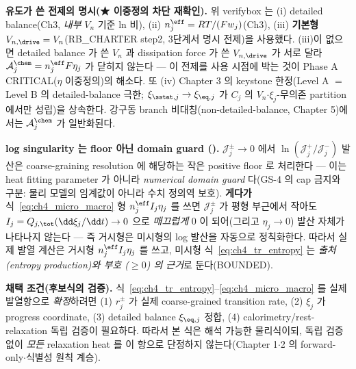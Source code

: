 \textbf{유도가 쓴 전제의 명시(★ 이중정의 차단 재확인).} 위 verifybox 는 (i) detailed balance(Ch3, \emph{내부}
$V_n$ 기준 ln 비), (ii) $n_j^{\eff}=RT/(Fw_j)$(Ch3), (iii) \textbf{기본형 $V_{n,\drive}=V_n$}(RB\_CHARTER
step2, 3단계서 명시 전제)을 사용했다. (iii)이 없으면 detailed balance 가 쓴 $V_n$ 과 dissipation force 가 쓴
$V_{n,\drive}$ 가 서로 달라 $\mathcal A_j^{\chem}=n_j^{\eff}F\eta_j$ 가 닫히지 않는다 — 이 전제를 사용 시점에
박는 것이 Phase A CRITICAL($\eta$ 이중정의)의 해소다. 또 (iv) Chapter 3 의 keystone 한정(Level A $=$ Level B
의 detailed-balance 극한; $\xi_{\sstat,j}\to\xi_{\eq,j}$ 가 $C_j$ 의 $V_n$$\cdot$$\xi_j$-무의존 partition 에서만
성립)을 상속한다. 강구동 branch 비대칭(non-detailed-balance, Chapter 5)에서는 $\mathcal A_j^{\chem}$ 가 일반화된다.

\begin{boundbox}
\textbf{log singularity 는 floor 아닌 domain guard ().} $\mathcal J_j^\pm\to0$ 에서 $\ln(\mathcal J_j^+/\mathcal J_j^-)$
발산은 coarse-graining resolution 에 해당하는 작은 positive floor 로 처리한다 — 이는 heat fitting parameter 가
아니라 \emph{numerical domain guard} 다(GS-4 의 cap 금지와 구분: 물리 모델의 임계값이 아니라 수치 정의역 보호).
\textbf{게다가} 식~\eqref{eq:ch4_micro_macro} 형 $n_j^{\eff}I_j\eta_j$ 를 쓰면 $\mathcal J_j^\pm$ 가 평형 부근에서
작아도 $I_j=Q_{j,\tot}(\dd\xi_j/\dd t)\to0$ 으로 \emph{매끄럽게} 0 이 되어(그리고 $\eta_j\to0$) 발산 자체가
나타나지 않는다 — 즉 거시형은 미시형의 log 발산을 자동으로 정칙화한다. 따라서 실제 발열 계산은 거시형
$n_j^{\eff}I_j\eta_j$ 를 쓰고, 미시형 식~\eqref{eq:ch4_tr_entropy} 는 \emph{출처(entropy production)와 부호
($\ge0$) 의 근거}로 둔다(BOUNDED).
\end{boundbox}

\textbf{채택 조건(후보식의 검증).} 식~\eqref{eq:ch4_tr_entropy}--\eqref{eq:ch4_micro_macro} 를 실제 발열항으로
\emph{확정}하려면 (1) $r_j^\pm$ 가 실제 coarse-grained transition rate, (2) $\xi_j$ 가 progress coordinate,
(3) detailed balance $\xi_{\eq,j}$ 정합, (4) calorimetry/rest-relaxation 독립 검증이 필요하다. 따라서 본 식은
해석 가능한 물리식이되, 독립 검증 없이 \emph{모든} relaxation heat 를 이 항으로 단정하지 않는다(Chapter 1$\cdot$2
의 forward-only$\cdot$식별성 원칙 계승).

